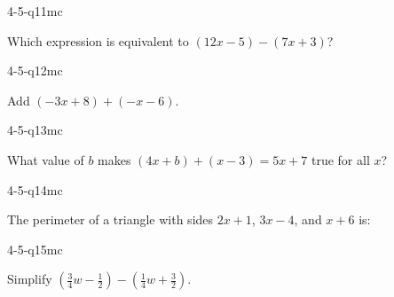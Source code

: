 \begin{practiceQuestion}{4-5-q11}{mc}
\begin{questionText}
Which expression is equivalent to $(12x - 5) - (7x + 3)$?
\end{questionText}
\end{practiceQuestion}

\begin{practiceQuestion}{4-5-q12}{mc}
\begin{questionText}
Add $(-3x + 8) + (-x - 6)$.
\end{questionText}
\end{practiceQuestion}

\begin{practiceQuestion}{4-5-q13}{mc}
\begin{questionText}
What value of $b$ makes $(4x + b) + (x - 3) = 5x + 7$ true for all $x$?
\end{questionText}
\end{practiceQuestion}

\begin{practiceQuestion}{4-5-q14}{mc}
\begin{questionText}
The perimeter of a triangle with sides $2x + 1$, $3x - 4$, and $x + 6$ is:
\end{questionText}
\end{practiceQuestion}

\begin{practiceQuestion}{4-5-q15}{mc}
\begin{questionText}
Simplify $\left(\frac{3}{4}w - \frac{1}{2}\right) - \left(\frac{1}{4}w + \frac{3}{2}\right)$.
\end{questionText}
\end{practiceQuestion}


